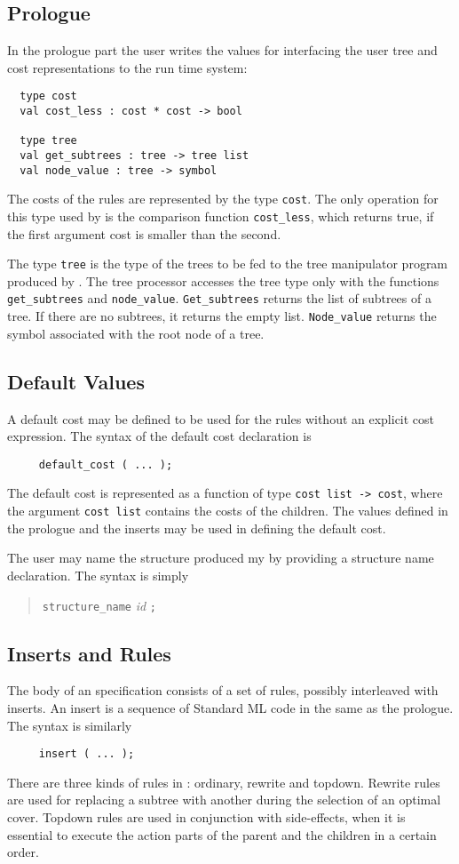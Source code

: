 \subsection{Prologue}\label{prologue}
In the prologue part the user writes the values for interfacing the
user tree and cost representations to the \mltwig run time system:
\begin{verbatim}
  type cost
  val cost_less : cost * cost -> bool

  type tree
  val get_subtrees : tree -> tree list
  val node_value : tree -> symbol
\end{verbatim}

The costs of the rules are represented by the type {\tt cost}.
The only operation for this type used by \mltwig is
the comparison function {\tt cost\_less}, which returns true, if
the first argument cost is smaller than the second.

The type {\tt tree} is the type of the trees to be fed to the tree manipulator
program produced by \mltwig. The tree processor accesses the tree type
only with the functions {\tt get\_subtrees} and {\tt node\_value}.
{\tt Get\_subtrees} returns the list of subtrees of a tree. If there are
no subtrees, it returns the empty list. {\tt Node\_value} returns the
symbol associated with the root node of a tree.

\subsection{Default Values}
A default cost may be defined to be used for the rules without an
explicit cost expression.
The syntax of the default cost declaration is
\begin{verbatim}
     default_cost ( ... );
\end{verbatim}

The default cost is represented as a function of type {\tt cost list -> cost},
where the argument {\tt cost list} contains the costs of the children.
The values defined in the prologue and the inserts may be used
in defining the default cost.

The user may name the structure produced my \mltwig by providing
a structure name declaration. The syntax is simply
\begin{quote}
  {\tt structure\_name} {\em id} {\tt ;}
\end{quote}

\subsection{Inserts and Rules}\label{rules}
The body of an \mltwig specification consists of a set of rules,
possibly interleaved with inserts. An insert is a sequence of
Standard ML code in the same as the prologue. The syntax is similarly
\begin{verbatim}
     insert ( ... );
\end{verbatim}
There are three kinds of rules in \mltwig: ordinary, rewrite and
topdown. Rewrite rules are used for replacing a subtree
with another during the selection of an optimal cover. Topdown
rules are used in conjunction with side-effects, when it is
essential to execute the action parts of the parent and the children
in a certain order.

